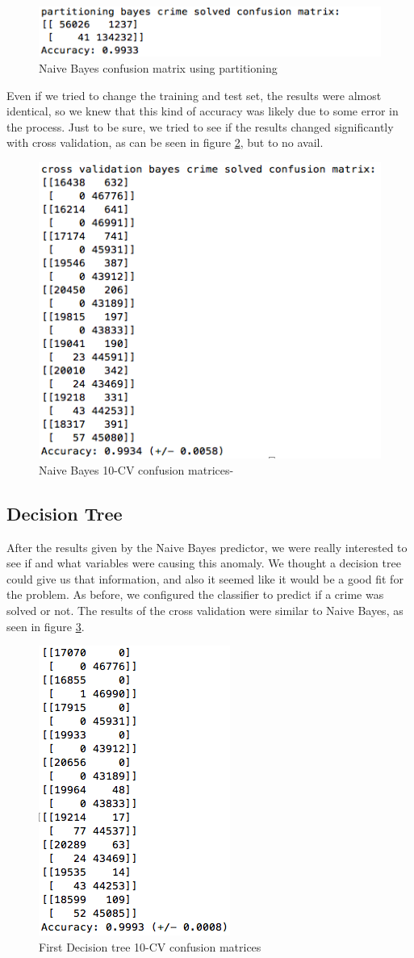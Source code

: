\documentclass[12pt]{report}
\begin{document}
\begin{figure}[h]
  \centering
  \includegraphics[width=0.5\linewidth]{../Images/PartitioningNaiveBayesCM}
  \caption{Naive Bayes confusion matrix using partitioning}
  \label{fig:PNBCM}
\end{figure}

Even if we tried to change the training and test set, the results were almost identical, so we knew that this kind of accuracy was likely due to some error in the process. Just to be sure, we tried to see if the results changed significantly with cross validation, as can be seen in figure \ref{fig:CVNBCM}, but to no avail.

\begin{figure}[h]
  \centering
  \includegraphics[width=0.5\linewidth]{../Images/CVNaiveBayesCM}
  \caption{Naive Bayes 10-CV confusion matrices-}
  \label{fig:CVNBCM}
\end{figure}

\subsection{Decision Tree}

After the results given by the Naive Bayes predictor, we were really interested to see if and what variables were causing this anomaly. We thought a decision tree could give us that information, and also it seemed like it would be a good fit for the problem. As before, we configured the classifier to predict if a crime was solved or not. The results of the cross validation were similar to Naive Bayes, as seen in figure \ref{fig:PDTCM}.

\begin{figure}[h]
  \centering
  \includegraphics[width=0.25\linewidth]{../Images/PerfectDecisionTreeCM}
  \caption{First Decision tree 10-CV confusion matrices}
  \label{fig:PDTCM}
\end{figure}
\end{document}
